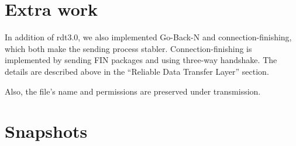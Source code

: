 \documentclass[10pt,a4paper]{article}
\begin{document}
\section{Extra work}
    In addition of rdt3.0, we also implemented Go-Back-N and connection-finishing, which both make the sending process stabler. Connection-finishing is implemented by sending FIN packages and using three-way handshake. The details are described above in the ``Reliable Data Transfer Layer'' section.


    Also, the file's name and permissions are preserved under transmission.
\section{Snapshots}
\end{document}

